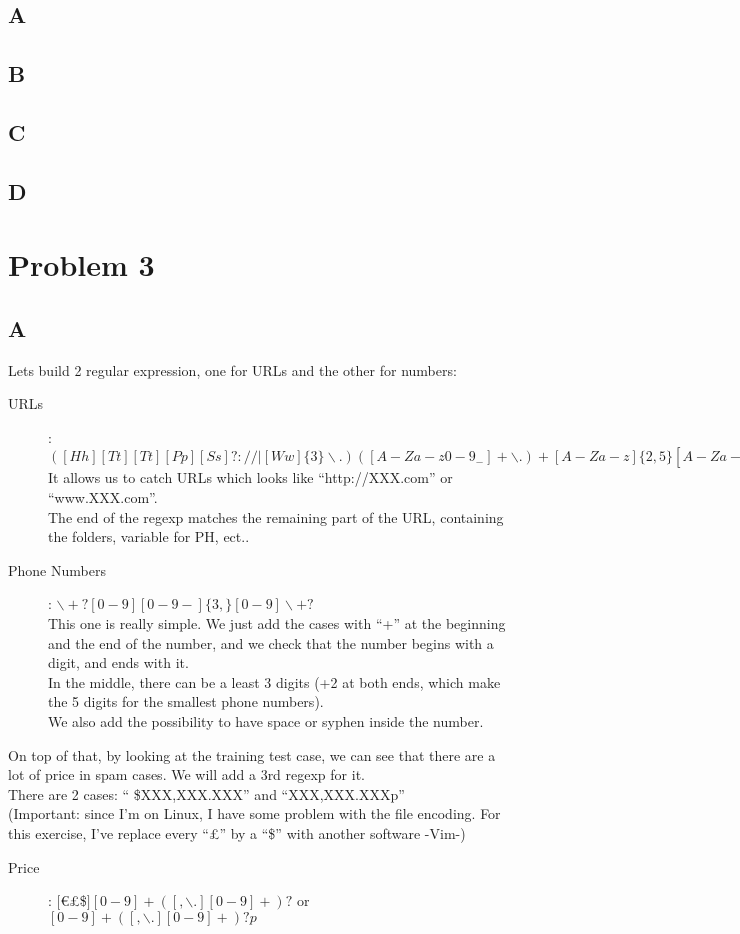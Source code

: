 \documentclass{article}
\begin{document}
        \subsection{A}
        \subsection{B}
        \subsection{C}
        \subsection{D}
    \newpage
    \section{Problem 3}
        \subsection{A}
            Lets build 2 regular expression, one for URLs and the other for numbers:
            \begin{description}
                \item[URLs]: $([Hh][Tt][Tt][Pp][Ss]?://|[Ww]\{3\}\backslash .)([A-Za-z0-9_ -]+\backslash .)+[A-Za-z]\{2,5\}[A-Za-z0-9/_? = -]*$\\
                    It allows us to catch URLs which looks like ``http://XXX.com'' or ``www.XXX.com''.\\
                    The end of the regexp matches the remaining part of the URL, containing the folders, variable for PH, ect..
                \item[Phone Numbers]: $\backslash+?[0-9][0-9 -]\{3,\}[0-9]\backslash+?$\\
                    This one is really simple. We just add the cases with ``+'' at the beginning and the end of the number, and we check that the number begins with a digit, and ends with it.\\
                    In the middle, there can be a least 3 digits (+2 at both ends, which make the 5 digits for the smallest phone numbers).\\
                    We also add the possibility to have space or syphen inside the number.
            \end{description}
            On top of that, by looking at the training test case, we can see that there are a lot of price in spam cases. We will add a 3rd regexp for it.\\
            There are 2 cases: `` \$XXX,XXX.XXX'' and ``XXX,XXX.XXXp''\\
            (Important: since I'm on Linux, I have some problem with the file encoding. For this exercise, I've replace every ``£'' by a ``\$'' with another software -Vim-)
            \begin{description}
                \item[Price]: $[$\euro£\$$][0-9]+([,\backslash.][0-9]+)?$ or $[0-9]+([,\backslash.][0-9]+)?p$
            \end{description}
\end{document}
